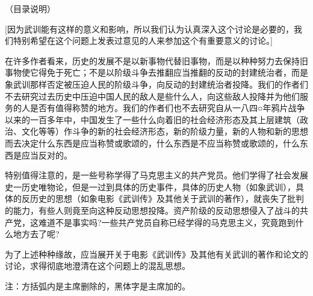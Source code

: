 （目录说明）

[因为武训能有这样的意义和影响，所以我们认为认真深入这个讨论是必要的，我们特别希望在这个问题上发表过意见的人来参加这个有重要意义的讨论。]

在许多作者看来，历史的发展不是以新事物代替旧事物，而是以种种努力去保持旧事物使它得免于死亡；不是以阶级斗争去推翻应当推翻的反动的封建统治者，而是象武训那样否定被压迫人民的阶级斗争，向反动的封建统治者投降。我们的作者们不去研究过去历史中压迫中国人民的敌人是些什么人，向这些敌人投降并为他们服务的人是否有值得称赞的地方。我们的作者们也不去研究自从一八四○年鸦片战争以来的一百多年中，中国发生了一些什么向着旧的社会经济形态及其上层建筑（政治、文化等等）作斗争的新的社会经济形态，新的阶级力量，新的人物和新的思想而去决定什么东西是应当称赞或歌颂的，什么东西是不应当称赞或歌颂的，什么东西是应当反对的。

特别值得注意的，是一些号称学得了马克思主义的共产党员。他们学得了社会发展史一历史唯物论，但是一过到具体的历史事件，具体的历史人物（如象武训），具体的反历史的思想（如象电影《武训传》及其他关于武训的著作），就丧失了批判的能力，有些人则竟至向这种反动思想投降。资产阶级的反动思想侵入了战斗的共产党，这难道不是事实吗?一些共产党员自称已经学得的马克思主义，究竟跑到什么地方去了呢?

为了上述种种缘故，应当展开关于电影《武训传》及其他有关武训的著作和论文的讨论，求得彻底地澄清在这个问题上的混乱思想。

注：方括弧内是主席删除的，黑体字是主席加的。


